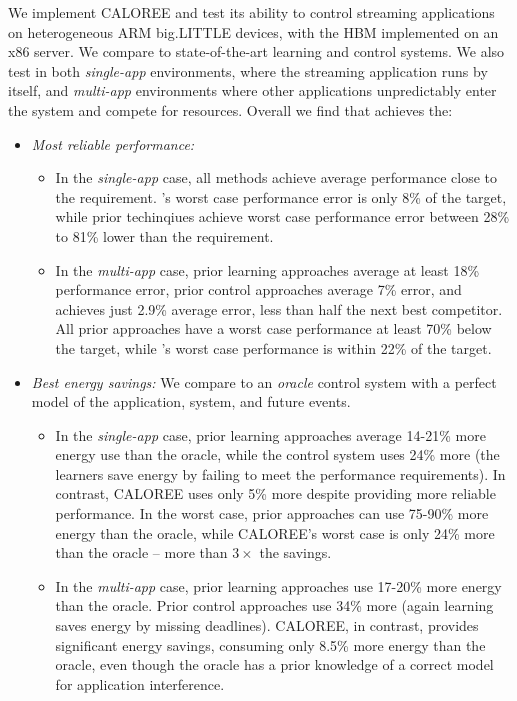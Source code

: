 We implement CALOREE and test its ability to control streaming
applications on heterogeneous ARM big.LITTLE devices, with the HBM
implemented on an x86 server.  We compare to state-of-the-art learning
and control systems.  We also test \SYSTEM{} in both \emph{single-app}
environments, where the streaming application runs by itself, and
\emph{multi-app} environments where other applications unpredictably
enter the system and compete for resources. Overall we find that
\SYSTEM{} achieves the:
\begin{itemize}
\item \textit{Most reliable performance:} 
  \begin{itemize} 
  \item In the \emph{single-app} case, all methods achieve average
    performance close to the requirement.  \SYSTEM{}'s worst case
    performance error is only 8\% of the target, while prior
    techinqiues achieve worst case performance error between 28\%
    to 81\% lower than the requirement.
  \item In the \emph{multi-app} case, prior learning approaches
    average at least 18\% performance error, prior control approaches
    average 7\% error, and \SYSTEM{} achieves just 2.9\% average
    error, less than half the next best competitor.  All prior
    approaches have a worst case performance at least 70\% below the
    target, while \SYSTEM{}'s worst case performance is within 22\% of
    the target.
    \end{itemize}
  \item \textit{Best energy savings:} We compare to an \emph{oracle}
    control system with a perfect model of the application, system,
    and future events.  
    \begin{itemize}
    \item In the \emph{single-app} case, prior learning approaches
      average 14-21\% more energy use than the oracle, while the
      control system uses 24\% more (the learners save energy by
      failing to meet the performance requirements).  In contrast,
      CALOREE uses only 5\% more despite providing more reliable
      performance.  In the worst case, prior approaches can use
      75-90\% more energy than the oracle, while CALOREE's worst case
      is only 24\% more than the oracle -- more than $3\times$ the
      savings.
    \item In the \emph{multi-app} case, prior learning approaches use
      17-20\% more energy than the oracle.  Prior control approaches
      use 34\% more (again learning saves energy by missing
      deadlines).  CALOREE, in contrast, provides significant energy
      savings, consuming only 8.5\% more energy than the oracle, even
      though the oracle has a prior knowledge of a correct model for
      application interference.
    \end{itemize}
\end{itemize}

